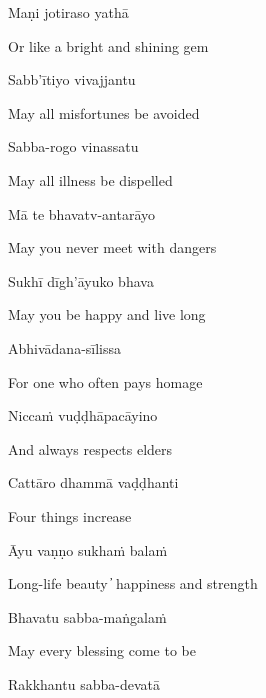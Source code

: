 Maṇi jotiraso yathā

\begin{cprenglish}
  Or like a bright and shining gem\\
\end{cprenglish}

Sabb'ītiyo vivajjantu

\begin{cprenglish}
  May all misfortunes be avoided
\end{cprenglish}

Sabba-rogo vinassatu

\begin{cprenglish}
  May all illness be dispelled
\end{cprenglish}

Mā te bhavatv-antarāyo

\begin{cprenglish}
  May you never meet with dangers
\end{cprenglish}

Sukhī dīgh'āyuko bhava

\begin{cprenglish}
  May you be happy and live long
\end{cprenglish}

Abhivādana-sīlissa

\begin{cprenglish}
For one who often pays homage
\end{cprenglish}

Niccaṁ vuḍḍhāpacāyino

\begin{cprenglish}
And always respects elders
\end{cprenglish}

Cattāro dhammā vaḍḍhanti

\begin{cprenglish}
Four things increase
\end{cprenglish}

Āyu vaṇṇo sukhaṁ balaṁ

\begin{cprenglish}
Long-life beauty  ̓  happiness and strength
\end{cprenglish}

Bhavatu sabba-maṅgalaṁ

\begin{cprenglish}
  May every blessing come to be
\end{cprenglish}

Rakkhantu sabba-devatā

